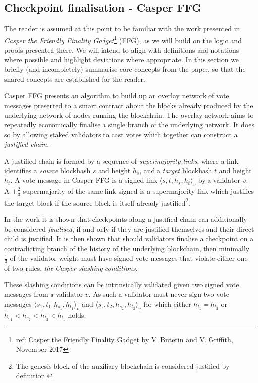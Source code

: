 \documentclass[12pt,a4paper]{article}
\begin{document}
\subsection{Checkpoint finalisation - Casper FFG}
The reader is assumed at this point to be familiar with the work presented in \textit{Casper the Friendly Finality Gadget}\footnote{ref: Casper the Friendly Finality Gadget by V. Buterin and V. Griffith, November 2017} (FFG), as we will build on the logic and proofs presented there.  We will intend to align with definitions and notations where possible and highlight deviations where appropriate. In this section we briefly (and incompletely) summarise core concepts from the paper, so that the shared concepts are established for the reader.

Casper FFG presents an algorithm to build up an overlay network of vote messages presented to a smart contract about the blocks already produced by the underlying network of nodes running the blockchain.  The overlay network aims to repeatedly economically finalise a single branch of the underlying network.  It does so by allowing staked validators to cast votes which together can construct a \emph{justified chain}.

A justified chain is formed by a sequence of \emph{supermajority links}, where a link identifies a \emph{source} blockhash $s$ and height $h_s$, and a \emph{target} blockhash $t$ and height $h_t$. A vote message in Casper FFG is a signed link $\langle s, t, h_s, h_t\rangle_v$ by a validator $v$. A $+\tfrac{2}{3}$ supermajority of the same link signed is a supermajority link which justifies the target block if the source block is itself already justified\footnote{The genesis block of the auxiliary blockchain is considered justified by definition.}.

In the work it is shown that checkpoints along a justified chain can additionally be considered \emph{finalised}, if and only if they are justified themselves and their direct child is justified.  It is then shown that should validators finalise a checkpoint on a contradicting branch of the history of the underlying blockchain, then minimally $\tfrac{1}{3}$ of the validator weight must have signed vote messages  that violate either one of two rules, \emph{the Casper slashing conditions}.

These slashing conditions can be intrinsically validated given two signed vote messages from a validator $v$.  As such a validator must never sign two vote messages $\langle s_1, t_1, h_{s_1}, h_{t_1}\rangle_v$ and $\langle s_2, t_2, h_{s_2}, h_{t_2}\rangle_v$ for which either $h_{t_1} = h_{t_2}$ or $h_{s_1} < h_{s_2} < h_{t_2} < h_{t_1}$ holds.
\end{document}
